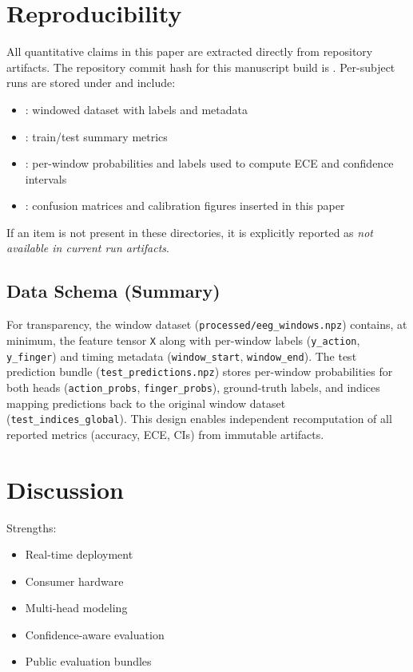 \documentclass[conference]{IEEEtran}
\newcommand{\NotAvailable}{\textit{not available in current run artifacts}}
\begin{document}
\section{Reproducibility}
All quantitative claims in this paper are extracted directly from repository artifacts. The repository commit hash for this manuscript build is \RepoCommitSha. Per-subject runs are stored under  and include:
\begin{itemize}
\item {}: windowed dataset with labels and metadata
\item {}: train/test summary metrics
\item {}: per-window probabilities and labels used to compute ECE and confidence intervals
\item {}: confusion matrices and calibration figures inserted in this paper
\end{itemize}
If an item is not present in these directories, it is explicitly reported as \NotAvailable.

\subsection{Data Schema (Summary)}
For transparency, the window dataset (\texttt{processed/eeg\_windows.npz}) contains, at minimum, the feature tensor \texttt{X} along with per-window labels (\texttt{y\_action}, \texttt{y\_finger}) and timing metadata (\texttt{window\_start}, \texttt{window\_end}). The test prediction bundle (\texttt{test\_predictions.npz}) stores per-window probabilities for both heads (\texttt{action\_probs}, \texttt{finger\_probs}), ground-truth labels, and indices mapping predictions back to the original window dataset (\texttt{test\_indices\_global}). This design enables independent recomputation of all reported metrics (accuracy, ECE, CIs) from immutable artifacts.

\section{Discussion}

Strengths:
\begin{itemize}
\item Real-time deployment
\item Consumer hardware
\item Multi-head modeling
\item Confidence-aware evaluation
\item Public evaluation bundles
\end{itemize}
\end{document}
